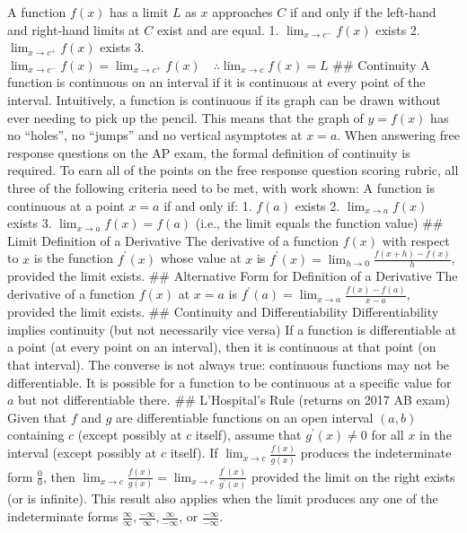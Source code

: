 \documentclass[
]{article}
\begin{document}
A function \(f(x)\) has a limit \(L\) as \(x\) approaches \(C\) if and
only if the left-hand and right-hand limits at \(C\) exist and are
equal. 1. \(\lim _{x \rightarrow c^{-}} f(x)\) exists 2.
\(\lim _{x \rightarrow c^{+}} f(x)\) exists 3.
\(\lim _{x \rightarrow c^{-}} f(x)=\lim _{x \rightarrow c^{+}} f(x) \quad \therefore \lim _{x \rightarrow c} f(x)=L\)
\#\# Continuity A function is continuous on an interval if it is
continuous at every point of the interval. Intuitively, a function is
continuous if its graph can be drawn without ever needing to pick up the
pencil. This means that the graph of \(y=f(x)\) has no ``holes'', no
``jumps'' and no vertical asymptotes at \(x=a\). When answering free
response questions on the AP exam, the formal definition of continuity
is required. To earn all of the points on the free response question
scoring rubric, all three of the following criteria need to be met, with
work shown: A function is continuous at a point \(x=a\) if and only if:
1. \(f(a)\) exists 2. \(\lim _{x \rightarrow a} f(x)\) exists 3.
\(\lim _{x \rightarrow a} f(x)=f(a)\) (i.e., the limit equals the
function value) \#\# Limit Definition of a Derivative The derivative of
a function \(f(x)\) with respect to \(x\) is the function
\(f^{\prime}(x)\) whose value at \(x\) is
\(f^{\prime}(x)=\lim _{h \rightarrow 0} \frac{f(x+h)-f(x)}{h}\),
provided the limit exists. \#\# Alternative Form for Definition of a
Derivative The derivative of a function \(f(x)\) at \(x=a\) is
\(f^{\prime}(a)=\lim _{x \rightarrow a} \frac{f(x)-f(a)}{x-a}\),
provided the limit exists. \#\# Continuity and Differentiability
Differentiability implies continuity (but not necessarily vice versa) If
a function is differentiable at a point (at every point on an interval),
then it is continuous at that point (on that interval). The converse is
not always true: continuous functions may not be differentiable. It is
possible for a function to be continuous at a specific value for \(a\)
but not differentiable there. \#\# L'Hospital's Rule (returns on 2017 AB
exam) Given that \(f\) and \(g\) are differentiable functions on an open
interval \((a, b)\) containing \(c\) (except possibly at \(c\) itself),
assume that \(g^{\prime}(x) \neq 0\) for all \(x\) in the interval
(except possibly at \(c\) itself). If
\(\lim _{x \rightarrow c} \frac{f(x)}{g(x)}\) produces the indeterminate
form \(\frac{0}{0}\), then
\(\lim _{x \rightarrow c} \frac{f(x)}{g(x)}=\lim _{x \rightarrow c} \frac{f^{\prime}(x)}{g^{\prime}(x)}\)
provided the limit on the right exists (or is infinite). This result
also applies when the limit produces any one of the indeterminate forms
\(\frac{\infty}{\infty}, \frac{-\infty}{\infty}, \frac{\infty}{-\infty}\),
or \(\frac{-\infty}{-\infty}\).
\end{document}
